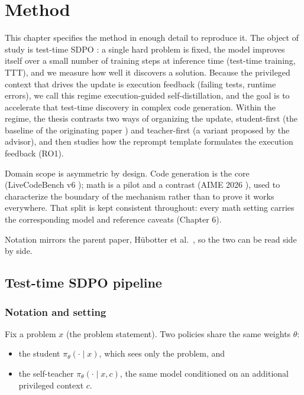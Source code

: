 \chapter{Method}\label{chapter-3-method}

This chapter specifies the method in enough detail to reproduce it. The object of study is test-time SDPO \cite{r1}: a single hard problem is fixed, the model improves itself over a small number of training steps at inference time (test-time training, TTT), and we measure how well it discovers a solution. Because the privileged context that drives the update is execution feedback (failing tests, runtime errors), we call this regime execution-guided self-distillation, and the goal is to accelerate that test-time discovery in complex code generation. Within the regime, the thesis contrasts two ways of organizing the update, student-first (the baseline of the originating paper \cite{r1}) and teacher-first (a variant proposed by the advisor), and then studies how the reprompt template formulates the execution feedback (RO1).

Domain scope is asymmetric by design. Code generation is the core (LiveCodeBench v6 \cite{r6}); math is a pilot and a contrast (AIME 2026 \cite{r10}), used to characterize the boundary of the mechanism rather than to prove it works everywhere. That split is kept consistent throughout: every math setting carries the corresponding model and reference caveats (Chapter 6).

Notation mirrors the parent paper, Hübotter et al.~\cite{r1}, so the two can be read side by side.

\section{Test-time SDPO pipeline}\label{test-time-sdpo-pipeline}

\subsection{Notation and setting}\label{notation-and-setting}

Fix a problem \(x\) (the problem statement). Two policies share the same weights \(\theta\):

\begin{itemize}
\tightlist
\item
  the student \(\pi_\theta(\cdot \mid x)\), which sees only the problem, and
\item
  the self-teacher \(\pi_\theta(\cdot \mid x, c)\), the same model conditioned on an additional privileged context \(c\).
\end{itemize}

